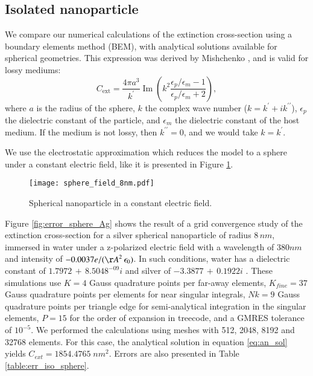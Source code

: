 
\subsection{Isolated nanoparticle} \label{sec:verification}

We compare our numerical calculations of the extinction cross-section using a boundary
elements method (BEM), with analytical solutions available for spherical geometries. 
This expression was derived by Mishchenko \cite{Mishchenko2007}, and is valid for lossy mediums:
%
\begin{equation} 
    C_\text{ext} = \frac{4\pi a^3}{k^\prime} \operatorname{Im}\left(k^2 
                    \frac{\epsilon_p/\epsilon_m -1}{\epsilon_p/\epsilon_m +2}\right),
    \label{eq:an_sol}
\end{equation}
%
where $a$ is the radius of the sphere, $k$ the complex wave number ($k=k^\prime +i k^{\prime\prime}$), $\epsilon_p$ 
the dielectric constant of the particle, and $\epsilon_m$ the dielectric constant
of the host medium. If the medium is not lossy, then $k^{\prime\prime}=0$, and we would take $k=k^\prime$.

We use the electrostatic approximation which reduces the model to a 
sphere under a constant electric field, like it is presented in Figure \ref{fig:np_elec_field}.
%
\begin{figure}[h] %
   \centering
   \texttt{[image: sphere\_field\_8nm.pdf]} 
   \caption{Spherical nanoparticle in a constant electric field.}
   \label{fig:np_elec_field}
\end{figure}
%
Figure \ref{fig:error_sphere_Ag} shows the result of a grid convergence study of the extinction
cross-section for a silver spherical nanoparticle of radius $8 \, nm$, immersed in water
under a z-polarized electric field with a wavelength of $380 nm$ and intensity of 
$-0.0037 e/({\AA}^2 \, \epsilon_0)$. In such conditions, water has a dielectric
constant of $1.7972 \, + \, 8.5048^{-09}i$ \cite{JohnsonChristy1972} and silver of
$-3.3877 \, + \, 0.1922i$ \cite{HaleQuerry1972}. These simulations use $K=4$ 
Gauss quadrature points per far-away elements, $K_{fine} = 37$ Gauss quadrature points
per elements for near singular integrals, $Nk = 9$ Gauss quadrature points per 
triangle edge for semi-analytical integration in the singular elements, $P=15$ for 
the order of expansion in treecode, and a GMRES tolerance of $10^{-5}$. We
performed the calculations using meshes with 512, 2048, 8192 and 32768 elements. For this case, the 
analytical solution in equation \eqref{eq:an_sol} yields $C_{ext} = 1854.4765 \; nm^2$.
Errors are also presented in Table \ref{table:err_iso_sphere}.


